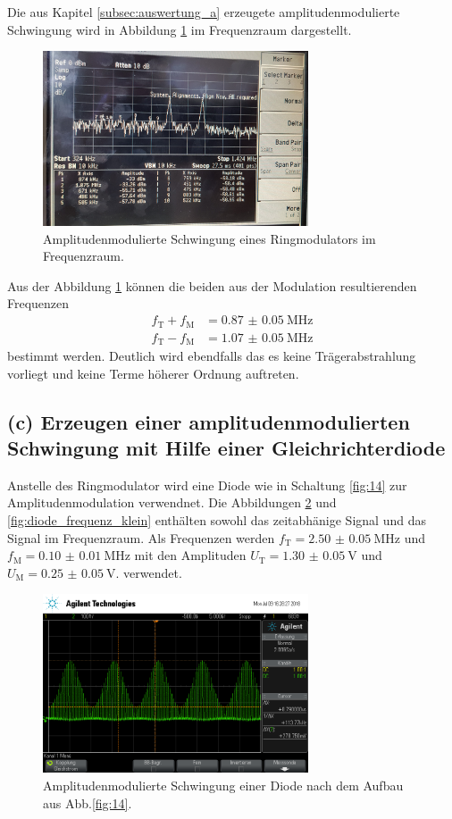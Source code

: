 Die aus Kapitel \ref{subsec:auswertung_a} erzeugete
amplitudenmodulierte Schwingung wird in Abbildung \ref{fig:ringamp_frequenz}
im Frequenzraum dargestellt.
\begin{figure}
  \centering
  \includegraphics[width=0.7\textwidth]{spec/frequenzbereich_klein_ring.jpg}
  \caption{Amplitudenmodulierte
  Schwingung eines Ringmodulators im Frequenzraum.}
  \label{fig:ringamp_frequenz}
\end{figure}
Aus der Abbildung \ref{fig:ringamp_frequenz}
können die beiden aus der Modulation resultierenden Frequenzen
\begin{align}
  f_{\text{T}}+f_{\text{M}}&=\SI{0.87(5)}{\mega\hertz} \\
  f_{\text{T}}-f_{\text{M}}&=\SI{1.07(5)}{\mega\hertz}
\end{align}
bestimmt werden.
Deutlich wird ebendfalls das es keine Trägerabstrahlung vorliegt und
keine Terme höherer Ordnung auftreten.

\subsection{(c) Erzeugen einer amplitudenmodulierten Schwingung
mit Hilfe einer Gleichrichterdiode}
\label{subsec:auswertung_c}
Anstelle des Ringmodulator wird eine Diode wie in Schaltung \ref{fig:14} zur Amplitudenmodulation verwendnet.
Die Abbildungen \ref{fig:diode_zeit} und \ref{fig:diode_frequenz_klein}
enthälten
sowohl das zeitabhänige Signal und das Signal im Frequenzraum.
Als Frequenzen werden $f_{\text{T}}=\SI{2.50(5)}{\mega\hertz}$ und
$f_{\text{M}}=\SI{0.10(1)}{\mega\hertz}$ mit den Amplituden
$U_{\text{T}}=\SI{1.30(5)}{\volt}$ und
$U_{\text{M}}=\SI{0.25(5)}{\volt}$.
verwendet.

\begin{figure}
  \centering
  \includegraphics[width=0.7\textwidth]{osci/amp_mod_diode.png}
  \caption{Amplitudenmodulierte
  Schwingung einer Diode nach dem Aufbau aus Abb.\ref{fig:14}.}
  \label{fig:diode_zeit}
\end{figure}

